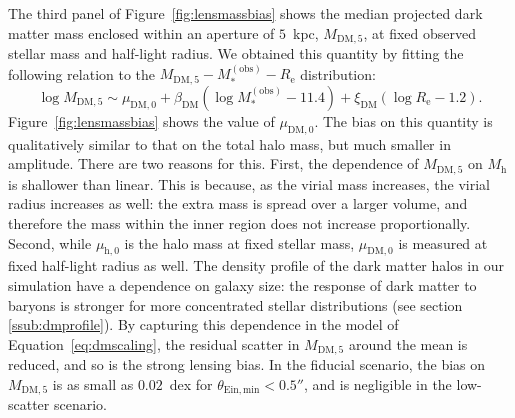 \documentclass{aa}
\def\reff{R_{\mathrm{e}}}
\def\mobs{M_*^{(\mathrm{obs})}}
\def\mdmfive{M_{\mathrm{DM}, 5}}
\def\mhalo{M_{\mathrm{h}}}
\def\Fref#1{Figure~\ref{#1}\xspace}
\def\Eref#1{Equation~\ref{#1}\xspace}
\begin{document}
The third panel of \Fref{fig:lensmassbias} shows the median projected dark matter mass enclosed within an aperture of $5$~kpc, $\mdmfive$, at fixed observed stellar mass and half-light radius.
We obtained this quantity by fitting the following relation to the $\mdmfive-\mobs-\reff$ distribution:
\begin{equation}\label{eq:dmscaling}
\log{\mdmfive} \sim \mu_{\mathrm{DM},0} + \beta_{\mathrm{DM}}(\log{\mobs} - 11.4) + \xi_{\mathrm{DM}}(\log{\reff} - 1.2).
\end{equation}
\Fref{fig:lensmassbias} shows the value of $\mu_{\mathrm{DM},0}$.
The bias on this quantity is qualitatively similar to that on the total halo mass, but much smaller in amplitude.
There are two reasons for this.
First, the dependence of $\mdmfive$ on $\mhalo$ is shallower than linear. This is because, as the virial mass increases, the virial radius increases as well: the extra mass is spread over a larger volume, and therefore the mass within the inner region does not increase proportionally.
Second, while $\mu_{\mathrm{h},0}$ is the halo mass at fixed stellar mass, $\mu_{\mathrm{DM},0}$ is measured at fixed half-light radius as well.
The density profile of the dark matter halos in our simulation have a dependence on galaxy size: the response of dark matter to baryons is stronger for more concentrated stellar distributions (see section \ref{ssub:dmprofile}).
By capturing this dependence in the model of \Eref{eq:dmscaling}, the residual scatter in $\mdmfive$ around the mean is reduced, and so is the strong lensing bias.
%
In the fiducial scenario, the bias on $\mdmfive$ is as small as $0.02$~dex for $\theta_{\mathrm{Ein,min}} < 0.5''$, and is negligible in the low-scatter scenario.
\end{document}
